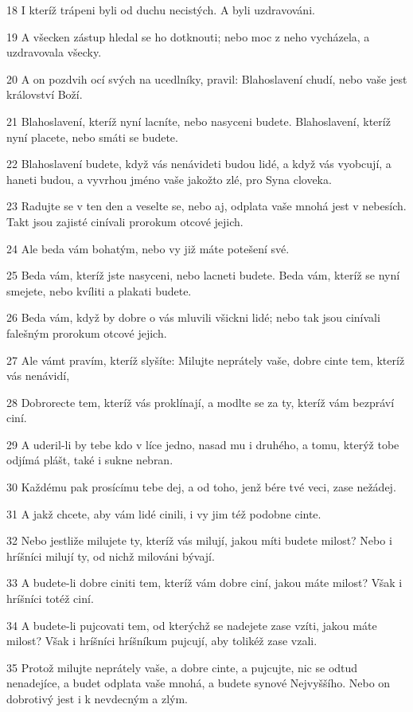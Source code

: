\par 18 I kteríž trápeni byli od duchu necistých. A byli uzdravováni.
\par 19 A všecken zástup hledal se ho dotknouti; nebo moc z neho vycházela, a uzdravovala všecky.
\par 20 A on pozdvih ocí svých na ucedlníky, pravil: Blahoslavení chudí, nebo vaše jest království Boží.
\par 21 Blahoslavení, kteríž nyní lacníte, nebo nasyceni budete. Blahoslavení, kteríž nyní placete, nebo smáti se budete.
\par 22 Blahoslavení budete, když vás nenávideti budou lidé, a když vás vyobcují, a haneti budou, a vyvrhou jméno vaše jakožto zlé, pro Syna cloveka.
\par 23 Radujte se v ten den a veselte se, nebo aj, odplata vaše mnohá jest v nebesích. Takt jsou zajisté cinívali prorokum otcové jejich.
\par 24 Ale beda vám bohatým, nebo vy již máte potešení své.
\par 25 Beda vám, kteríž jste nasyceni, nebo lacneti budete. Beda vám, kteríž se nyní smejete, nebo kvíliti a plakati budete.
\par 26 Beda vám, když by dobre o vás mluvili všickni lidé; nebo tak jsou cinívali falešným prorokum otcové jejich.
\par 27 Ale vámt pravím, kteríž slyšíte: Milujte neprátely vaše, dobre cinte tem, kteríž vás nenávidí,
\par 28 Dobrorecte tem, kteríž vás proklínají, a modlte se za ty, kteríž vám bezpráví ciní.
\par 29 A uderil-li by tebe kdo v líce jedno, nasad mu i druhého, a tomu, kterýž tobe odjímá plášt, také i sukne nebran.
\par 30 Každému pak prosícímu tebe dej, a od toho, jenž bére tvé veci, zase nežádej.
\par 31 A jakž chcete, aby vám lidé cinili, i vy jim též podobne cinte.
\par 32 Nebo jestliže milujete ty, kteríž vás milují, jakou míti budete milost? Nebo i hríšníci milují ty, od nichž milováni bývají.
\par 33 A budete-li dobre ciniti tem, kteríž vám dobre ciní, jakou máte milost? Však i hríšníci totéž ciní.
\par 34 A budete-li pujcovati tem, od kterýchž se nadejete zase vzíti, jakou máte milost? Však i hríšníci hríšníkum pujcují, aby tolikéž zase vzali.
\par 35 Protož milujte neprátely vaše, a dobre cinte, a pujcujte, nic se odtud nenadejíce, a budet odplata vaše mnohá, a budete synové Nejvyššího. Nebo on dobrotivý jest i k nevdecným a zlým.
